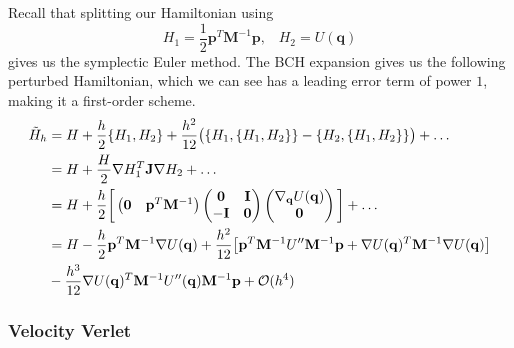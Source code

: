       Recall that splitting our Hamiltonian using 
      \begin{equation}
        H_1 = \frac{1}{2} \mathbf{p}^T \mathbf{M}^{-1} \mathbf{p}, \;\;\; H_2 = U(\mathbf{q})
      \end{equation}
      gives us the symplectic Euler method. The BCH expansion gives us the following perturbed Hamiltonian, which we can see has a leading error term of power $1$, making it a first-order scheme. 
      \begin{align*}
        \Tilde{H}_h & = H + \frac{h}{2} \{H_1, H_2\} + \frac{h^2}{12} \big( \{H_1, \{H_1, H_2\}\} - \{ H_2, \{ H_1, H_2\}\} \big) + \ldots \\
        & = H + \frac{H}{2} \nabla H_1^T \mathbf{J} \nabla H_2 + \ldots \\
        & = H + \frac{h}{2} \bigg[ \begin{pmatrix} \mathbf{0} & \mathbf{p}^T \mathbf{M}^{-1} \end{pmatrix} \begin{pmatrix} \mathbf{0} & \mathbf{I} \\ -\mathbf{I} & \mathbf{0} \end{pmatrix} \begin{pmatrix} \nabla_\mathbf{q} U(\mathbf{q}) \\ \mathbf{0} \end{pmatrix} \bigg] + \ldots \\ 
        & = H - \frac{h}{2} \mathbf{p}^T \mathbf{M}^{-1} \nabla U(\mathbf{q}) + \frac{h^2}{12} \big[ \mathbf{p}^T \mathbf{M}^{-1} U^{\prime\prime} \mathbf{M}^{-1} \mathbf{p} + \nabla U(\mathbf{q})^T \mathbf{M}^{-1} \nabla U(\mathbf{q}) \big] \\
        & - \frac{h^3}{12} \nabla U (\mathbf{q})^T \mathbf{M}^{-1} U^{\prime\prime} (\mathbf{q}) \mathbf{M}^{-1} \mathbf{p} + \mathcal{O}(h^4)
      \end{align*}

    \subsubsection{Velocity Verlet}

